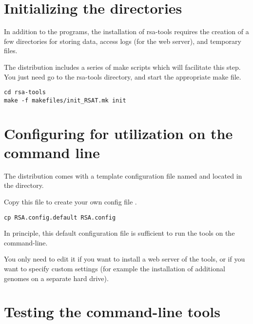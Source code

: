 \documentclass{article}
\begin{document}

\section{Initializing the directories}

In addition to the programs, the installation of rsa-tools requires
the creation of a few directories for storing data, access logs (for
the web server), and temporary files.  

The distribution includes a series of make scripts which will
facilitate this step. You just need go to the rsa-tools directory, and
start the appropriate make file.

\begin{verbatim}
cd rsa-tools
make -f makefiles/init_RSAT.mk init
\end{verbatim}


\section{Configuring \RSAT for utilization on the command line}

The \RSAT distribution comes with a template configuration file named
 and located in the 
directory.

Copy this file to create your own config file .

\begin{verbatim}
cp RSA.config.default RSA.config
\end{verbatim}

In principle, this default configuration file is sufficient to run the
tools on the command-line. 

You only need to edit it if you want to install a web server of the
tools, or if you want to specify custom settings (for example the
installation of additional genomes on a separate hard drive).





\section{Testing the command-line tools}
\end{document}
